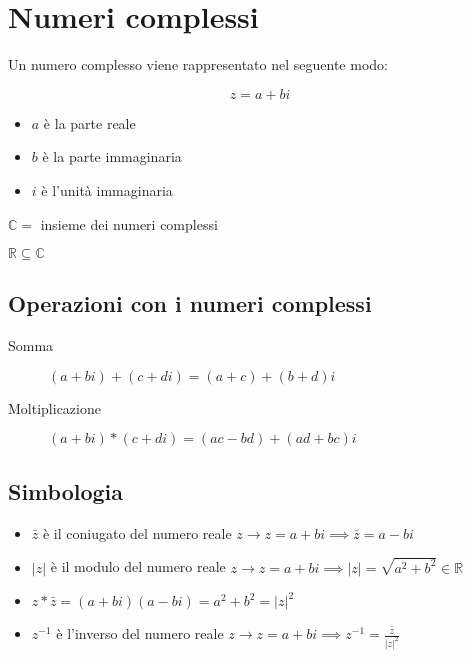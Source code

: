 \documentclass{subfiles}
\begin{document}
\section{Numeri complessi}

Un numero complesso viene rappresentato nel seguente modo:

$$
z = a + bi
$$

\begin{itemize}
    \item $a$ è la parte reale
    \item $b$ è la parte immaginaria
    \item $i$ è l'unità immaginaria
\end{itemize}

\begin{description}
    \item $\mathbb{C} =$ insieme dei numeri complessi
    \item $\mathbb{R} \subseteq \mathbb{C}$
\end{description}

\subsection{Operazioni con i numeri complessi}

\begin{description}
    \item[Somma] $(a+bi) + (c+di) = (a+c) + (b+d)i$
    \item[Moltiplicazione] $(a+bi) * (c+di) = (ac - bd) + (ad + bc)i$
\end{description}

\subsection{Simbologia}

\begin{itemize}
    \item $\bar{z}$ è il coniugato del numero reale $z \longrightarrow z = a+bi \implies \bar{z} = a-bi$
    \item $|z|$ è il modulo del numero reale $z \longrightarrow z = a+bi \implies |z| = \sqrt{a^2 + b^2} \in \mathbb{R}$
    \item $z * \bar{z} = (a+bi)(a-bi) = a^2 + b^2 = |z|^2$
    \item $z^{-1}$ è l'inverso del numero reale $z \longrightarrow z = a+bi \implies z^{-1} = \frac{\bar{z}}{|z|^2}$
\end{itemize}
\end{document}
